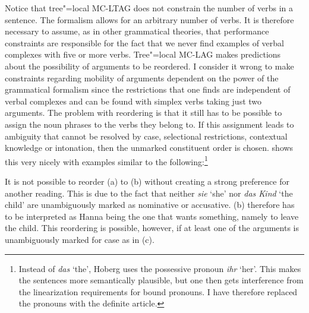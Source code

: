 Notice that tree"=local MC-LTAG does not constrain the number of verbs in a sentence. The formalism allows for an arbitrary number of verbs.
It is therefore necessary to assume, as in other grammatical theories, that performance constraints are responsible for the fact that we never find
examples of verbal complexes with five or more verbs. Tree"=local MC-LAG makes predictions about the possibility of arguments to be reordered.
I consider it wrong to make constraints regarding mobility of arguments dependent on the power of the grammatical formalism since the restrictions that
one finds are independent of verbal complexes and can be found with simplex verbs taking just two arguments.
The problem with reordering is that it still has to be possible to assign the noun phrases to the
verbs they belong to. If this assignment leads to ambiguity
that cannot be resolved by case, selectional restrictions, contextual knowledge or intonation, then the unmarked constituent order is chosen.
\citet*[]{Hoberg81a} shows this very nicely with examples similar to the
following:\footnote{%
 Instead of \emph{das} `the', Hoberg uses the possessive pronoun \emph{ihr} `her'.
 This makes the sentences more semantically plausible, but one then gets interference from the
 linearization requirements for bound pronouns. I have therefore replaced the pronouns with the
 definite article.%
}
\eal
\judgewidth{\#}
\zl

\noindent
It is not possible to reorder (a)  to (b) without creating a strong preference for another reading.
This is due to the fact that neither \emph{sie} `she' nor \emph{das Kind} `the child' are unambiguously marked as
nominative or accusative. (b) therefore has to be interpreted as Hanna being the one that wants something, namely
to leave the child. This reordering is possible, however, if at least one of the arguments is unambiguously marked for case
as in (c).

